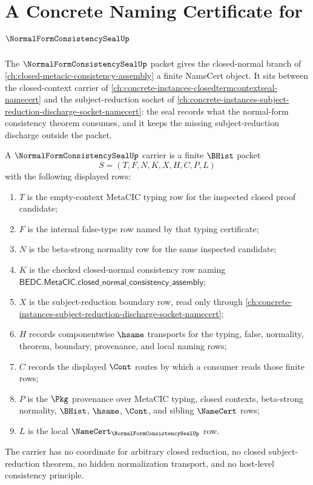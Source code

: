 \chapter{A Concrete Naming Certificate for $\NormalFormConsistencySealUp$}
\label{ch:concrete-instances-normal-form-consistency-seal-namecert}

The $\NormalFormConsistencySealUp$ packet gives the closed-normal branch of
\autoref{ch:closed-metacic-consistency-assembly} a finite NameCert object. It
sits between the closed-context carrier of
\autoref{ch:concrete-instances-closedtermcontextseal-namecert} and the
subject-reduction socket of
\autoref{ch:concrete-instances-subject-reduction-discharge-socket-namecert}:
the seal records what the normal-form consistency theorem consumes, and it
keeps the missing subject-reduction discharge outside the packet.

\begin{definition}
\label{def:normal-form-consistency-seal-carrier}
A $\NormalFormConsistencySealUp$ carrier is a finite $\BHist$ packet
$$
S=(T,F,N,K,X,H,C,P,L)
$$
with the following displayed rows:
\begin{enumerate}
\item $T$ is the empty-context MetaCIC typing row for the inspected closed
proof candidate;
\item $F$ is the internal false-type row named by that typing certificate;
\item $N$ is the beta-strong normality row for the same inspected candidate;
\item $K$ is the checked closed-normal consistency row naming
$\mathsf{BEDC.MetaCIC.closed\_normal\_consistency\_assembly}$;
\item $X$ is the subject-reduction boundary row, read only through
\autoref{ch:concrete-instances-subject-reduction-discharge-socket-namecert};
\item $H$ records componentwise $\hsame$ transports for the typing, false,
normality, theorem, boundary, provenance, and local naming rows;
\item $C$ records the displayed $\Cont$ routes by which a consumer reads those
finite rows;
\item $P$ is the $\Pkg$ provenance over MetaCIC typing, closed contexts,
beta-strong normality, $\BHist$, $\hsame$, $\Cont$, and sibling $\NameCert$
rows;
\item $L$ is the local $\NameCert_{\NormalFormConsistencySealUp}$ row.
\end{enumerate}
The carrier has no coordinate for arbitrary closed reduction, no closed
subject-reduction theorem, no hidden normalization transport, and no host-level
consistency principle.
\end{definition}

